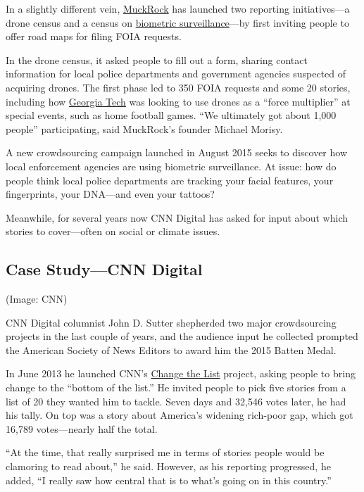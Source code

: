 \begin{itemize}
\begin{itemize}
\begin{enumerate}
In a slightly different vein, \href{https://www.muckrock.com/}{MuckRock} has launched two reporting initiatives---a drone census and a census on \href{https://www.muckrock.com/news/archives/2015/aug/04/street-level-surveillance-who-using-mobile-biometr/}{biometric surveillance}---by first inviting people to offer road maps for filing FOIA requests.\autocite{Morisy}

In the drone census, it asked people to fill out a form, sharing contact information for local police departments and government agencies suspected of acquiring drones. The first phase led to 350 FOIA requests and some 20 stories, including how \href{https://www.muckrock.com/news/archives/2013/jan/24/georgia-tech-police-wanted-fly-surveillance-drone-/}{Georgia Tech}\autocite{Drone}
was looking to use drones as a ``force multiplier'' at special events, such as home football games. ``We ultimately got about 1,000 people'' participating, said MuckRock’s founder Michael Morisy.\autocite{Morisy}

A new crowdsourcing campaign launched in August 2015 seeks to discover how local enforcement agencies are using biometric surveillance.\autocite{surveillance} At issue: how do people think local police departments are tracking your facial features, your fingerprints, your DNA---and even your tattoos?\autocite{Morisy}

Meanwhile, for several years now CNN Digital has asked for input about which stories to cover---often on social or climate issues.

\subsection{Case Study---CNN Digital} (Image: CNN) 

CNN Digital columnist John D. Sutter shepherded two major crowdsourcing projects in the last couple of years, and the audience input he collected prompted the American Society of News Editors to award him the 2015 Batten Medal.

In June 2013 he launched CNN’s \href{http://www.cnn.com/specials/opinion/change-the-list}{Change the List} project, asking people to bring change to the ``bottom of the list.''\autocite{CNN} He invited people to pick five stories from a list of 20 they wanted him to tackle. Seven days and 32,546 votes later, he had his tally. On top was a story about America’s widening rich-poor gap, which got 16,789 votes---nearly half the total.

``At the time, that really surprised me in terms of stories people would be clamoring to read about,'' he said.\autocite{CNN} However, as his reporting progressed, he added, ``I really saw how central that is to what’s going on in this country.''


\end{enumerate}
\end{itemize}
\end{itemize}
